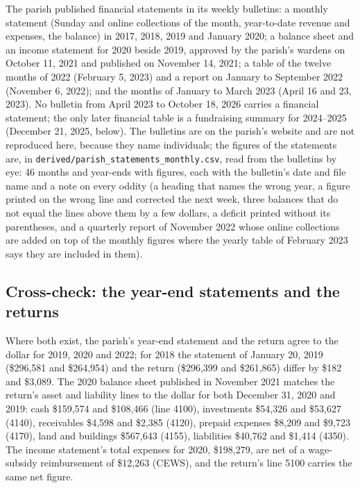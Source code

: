 \documentclass[11pt,letterpaper]{article}
\begin{document}
The parish published financial statements in its weekly bulletins: a monthly statement (Sunday and online collections of the month, year-to-date revenue and expenses, the balance) in 2017, 2018, 2019 and January 2020; a balance sheet and an income statement for 2020 beside 2019, approved by the parish's wardens on October 11, 2021 and published on November 14, 2021; a table of the twelve months of 2022 (February 5, 2023) and a report on January to September 2022 (November 6, 2022); and the months of January to March 2023 (April 16 and 23, 2023). No bulletin from April 2023 to October 18, 2026 carries a financial statement; the only later financial table is a fundraising summary for 2024--2025 (December 21, 2025, below). The bulletins are on the parish's website and are not reproduced here, because they name individuals; the figures of the statements are, in \texttt{derived/parish\_statements\_monthly.csv}, read from the bulletins by eye: 46 months and year-ends with figures, each with the bulletin's date and file name and a note on every oddity (a heading that names the wrong year, a figure printed on the wrong line and corrected the next week, three balances that do not equal the lines above them by a few dollars, a deficit printed without its parentheses, and a quarterly report of November 2022 whose online collections are added on top of the monthly figures where the yearly table of February 2023 says they are included in them).

\subsection{Cross-check: the year-end statements and the returns}

\begin{center}\small\end{center}

Where both exist, the parish's year-end statement and the return agree to the dollar for 2019, 2020 and 2022; for 2018 the statement of January 20, 2019 (\$296,581 and \$264,954) and the return (\$296,399 and \$261,865) differ by \$182 and \$3,089. The 2020 balance sheet published in November 2021 matches the return's asset and liability lines to the dollar for both December 31, 2020 and 2019: cash \$159,574 and \$108,466 (line 4100), investments \$54,326 and \$53,627 (4140), receivables \$4,598 and \$2,385 (4120), prepaid expenses \$8,209 and \$9,723 (4170), land and buildings \$567,643 (4155), liabilities \$40,762 and \$1,414 (4350). The income statement's total expenses for 2020, \$198,279, are net of a wage-subsidy reimbursement of \$12,263 (CEWS), and the return's line 5100 carries the same net figure.
\end{document}
